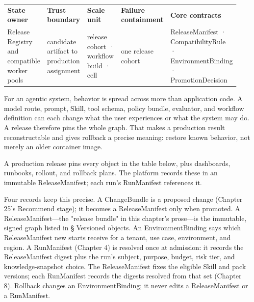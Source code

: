 \BookTableStart
\fontsize{7.2}{9}\selectfont
\begin{tabular}{@{}Y{0.1880\linewidth}Y{0.1880\linewidth}Y{0.1880\linewidth}Y{0.1880\linewidth}Y{0.1880\linewidth}@{}}
\color{white}\bfseries \textbf{State owner} & \color{white}\bfseries \textbf{Trust boundary} & \color{white}\bfseries \textbf{Scale unit} & \color{white}\bfseries \textbf{Failure containment} & \color{white}\bfseries \textbf{Core contracts} \\
Release Registry and compatible worker pools & candidate artifact to production assignment & release cohort · workflow build · cell & one release cohort & ReleaseManifest · CompatibilityRule · EnvironmentBinding · PromotionDecision \\
\end{tabular}
\BookTableEnd

For an agentic system, behavior is spread across more than application code. A model route, prompt, Skill, tool schema, policy bundle, evaluator, and workflow definition can each change what the user experiences or what the system may do. A release therefore pins the whole graph. That makes a production result reconstructable and gives rollback a precise meaning: restore known behavior, not merely an older container image.\par

A production release pins every object in the table below, plus dashboards, runbooks, rollout, and rollback plans. The platform records these in an immutable ReleaseManifest; each run's RunManifest references it.\par

Four records keep this precise. A ChangeBundle is a proposed change (Chapter 25's Recommend stage); it becomes a ReleaseManifest only when promoted. A ReleaseManifest—the "release bundle" in this chapter's prose—is the immutable, signed graph listed in § Versioned objects. An EnvironmentBinding says which ReleaseManifest new starts receive for a tenant, use case, environment, and region. A RunManifest (Chapter 4) is resolved once at admission: it records the ReleaseManifest digest plus the run's subject, purpose, budget, risk tier, and knowledge-snapshot choice. The ReleaseManifest fixes the eligible Skill and pack versions; each RunManifest records the digests resolved from that set (Chapter 8). Rollback changes an EnvironmentBinding; it never edits a ReleaseManifest or a RunManifest.\par

